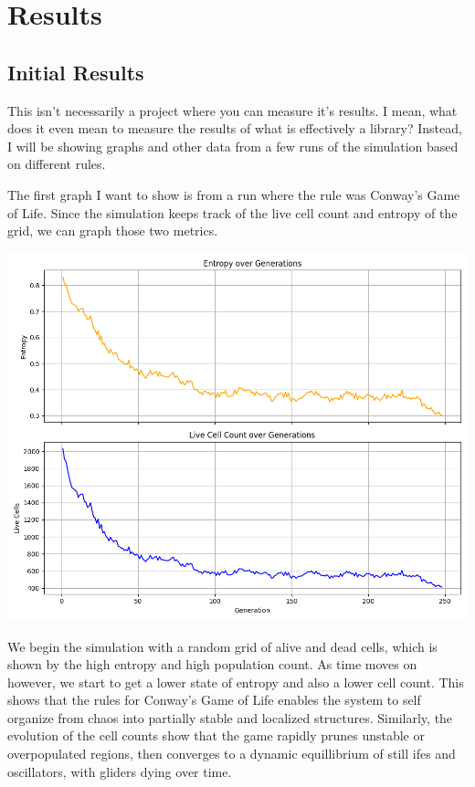 \documentclass[12pt]{article}
\begin{document}
\section{Results}

\subsection{Initial Results}
This isn't necessarily a project where you can measure it's results. I mean, what does it even mean to measure the results of what is effectively a library? Instead, I will be showing graphs and other data from a few runs of the simulation based on different rules.

The first graph I want to show is from a run where the rule was Conway's Game of Life.
Since the simulation keeps track of the live cell count and entropy of the grid, we can graph those two metrics.

\includegraphics[scale=0.6]{../figures/Figure_1.png}

We begin the simulation with a random grid of alive and dead cells, which is shown by the high entropy and high population count. As time moves on however, we start to get a lower state of entropy and also a lower cell count. This shows that the rules for Conway's Game of Life enables the system to self organize from chaos into partially stable and localized structures. Similarly, the evolution of the cell counts show that the game rapidly prunes unstable or overpopulated regions, then converges to a dynamic equillibrium of still ifes and oscillators, with gliders dying over time.
\end{document}
